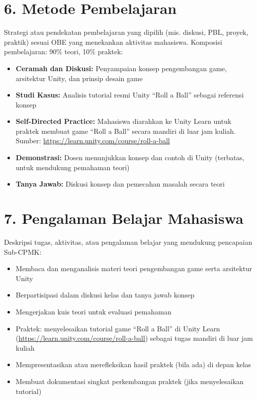 \documentclass[12pt,a4paper]{article}
\begin{document}
\section*{6. Metode Pembelajaran}

Strategi atau pendekatan pembelajaran yang dipilih (mis. diskusi, PBL, proyek, praktik) sesuai OBE yang menekankan aktivitas mahasiswa. Komposisi pembelajaran: 90\% teori, 10\% praktek:

\begin{itemize}[leftmargin=*]
  \item \textbf{Ceramah dan Diskusi:} Penyampaian konsep pengembangan game, arsitektur Unity, dan prinsip desain game
  \item \textbf{Studi Kasus:} Analisis tutorial resmi Unity ``Roll a Ball'' sebagai referensi konsep
  \item \textbf{Self-Directed Practice:} Mahasiswa diarahkan ke Unity Learn untuk praktek membuat game ``Roll a Ball'' secara mandiri di luar jam kuliah. Sumber: \url{https://learn.unity.com/course/roll-a-ball}
  \item \textbf{Demonstrasi:} Dosen menunjukkan konsep dan contoh di Unity (terbatas, untuk mendukung pemahaman teori)
  \item \textbf{Tanya Jawab:} Diskusi konsep dan pemecahan masalah secara teori
\end{itemize}

\vspace{0.5cm}

\section*{7. Pengalaman Belajar Mahasiswa}

Deskripsi tugas, aktivitas, atau pengalaman belajar yang mendukung pencapaian Sub-CPMK:

\begin{itemize}[leftmargin=*]
  \item Membaca dan menganalisis materi teori pengembangan game serta arsitektur Unity
  \item Berpartisipasi dalam diskusi kelas dan tanya jawab konsep
  \item Mengerjakan kuis teori untuk evaluasi pemahaman
  \item Praktek: menyelesaikan tutorial game ``Roll a Ball'' di Unity Learn (\url{https://learn.unity.com/course/roll-a-ball}) sebagai tugas mandiri di luar jam kuliah
  \item Mempresentasikan atau merefleksikan hasil praktek (bila ada) di depan kelas
  \item Membuat dokumentasi singkat perkembangan praktek (jika menyelesaikan tutorial)
\end{itemize}
\end{document}
